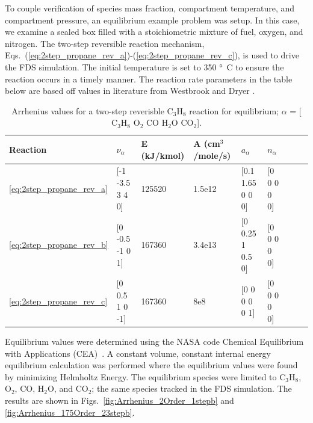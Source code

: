 \documentclass[11pt]{book}
\begin{document}
To couple verification of species mass fraction, compartment temperature, and compartment pressure, an equilibrium example problem was setup. In this case, we examine a sealed box filled with a stoichiometric mixture of fuel, oxygen, and nitrogen. The two-step reversible reaction mechanism, Eqs.~(\ref{eq:2step_propane_rev_a})-(\ref{eq:2step_propane_rev_c}), is used to drive the FDS simulation. The initial temperature is set to 350 \si{\degree C} to ensure the reaction occurs in a timely manner. The reaction rate parameters in the table below are based off values in literature from Westbrook and Dryer \cite{Westbrook:1}.
\begin{table}[ht]
\begin{center}
\caption[Arrhenius values for a two-step reversible C$_3$H$_8$ reaction]{Arrhenius values for a two-step reverisble C$_3$H$_8$ reaction for equilibrium; $\alpha$ = [$\mathrm{C_3H_8}$ $\mathrm{O_2}$ $\mathrm{CO}$ $\mathrm{H_2O}$ $\mathrm{CO_2}$].}
\label{two_step_eq_rev_c3h8}
\begin{tabular}{|l|l|l|l|l|l|l|l|l|}
\hline Reaction & $\nu_{\alpha}$ & E (kJ/kmol) & A (cm$^3$/mole/s) & $a_{\alpha}$ & $n_{\alpha}$  \\ \hline \hline
\ref{eq:2step_propane_rev_a} & [-1 -3.5 3 4 0] & 125520 & 1.5e12 & [0.1 1.65 0 0 0] & [0 0 0 0 0] \\ \hline
\ref{eq:2step_propane_rev_b} & [0 -0.5 -1 0 1] & 167360 & 3.4e13 & [0 0.25 1 0.5 0] & [0 0 0 0 0] \\ \hline
\ref{eq:2step_propane_rev_c} & [0 0.5 1 0 -1]  & 167360 & 8e8    & [0 0 0 0 0 1]    & [0 0 0 0 0] \\ \hline
\end{tabular}
\end{center}
\end{table}
Equilibrium values were determined using the NASA code Chemical Equilibrium with Applications (CEA)~\cite{Gordon:1994}. A constant volume, constant internal energy equilibrium calculation was performed where the equilibrium values were found by minimizing Helmholtz Energy. The equilibrium species were limited to $\mathrm{C_3H_8}$, $\mathrm{O_2}$, $\mathrm{CO}$, $\mathrm{H_2O}$, and $\mathrm{CO_2}$; the same species tracked in the FDS simulation.  The results are shown in Figs.~\ref{fig:Arrhenius_2Order_1stepb} and \ref{fig:Arrhenius_175Order_23stepb}.
\end{document}
